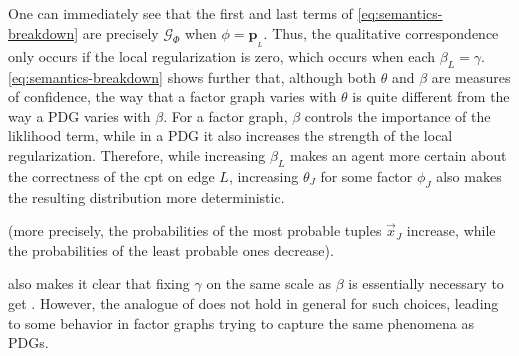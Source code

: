 \documentclass{article}
\theoremstyle{plain}
\theoremstyle{definition}
\theoremstyle{remark}
\newcommand\mat[1]{\mathbf{#1}}
\newcommand{\bp}[1][L]{\mat{p}_{\!_{#1}\!}}
\numberwithin{equation}{section}
\begin{document}
One can immediately see that the first and last terms of \eqref{eq:semantics-breakdown} are precisely $\mathcal G_\Phi$ when $\phi = \bp$. Thus, the qualitative correspondence only occurs if the 
local regularization
is zero, which occurs when each $\beta_L=\gamma$.
\eqref{eq:semantics-breakdown} shows further that, although
both $\theta$ and $\beta$ are measures of confidence, the way that 
a factor graph varies with $\theta$  
is quite different from the way a PDG varies with $\beta$. 
For a factor graph, $\beta$ controls the importance of the liklihood term, while in a PDG it also increases the strength of the local regularization. Therefore, while
increasing $\beta_L$ makes an agent more certain about the correctness of the cpt on edge $L$,
% 
increasing $\theta_J$ for some factor $\phi_J$ also makes the resulting distribution more deterministic.
\begin{vfull}
(more precisely, the probabilities of the most probable tuples $\vec{x}_J$ 
increase, while the probabilities of the least probable ones decrease). 
\end{vfull}

 also makes it clear that fixing $\gamma$ on the same scale as $\beta$ is
essentially necessary to get .
However, the analogue of  does not hold
in general for
such choices,
leading to some
behavior in factor graphs trying to capture the same phenomena as PDGs.
\end{document}
